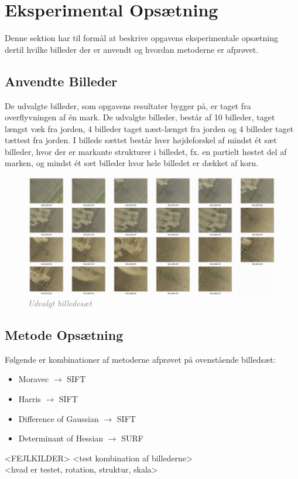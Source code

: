 \chapter{Eksperimental Opsætning}
Denne sektion har til formål at beskrive opgavens eksperimentale opsætning dertil hvilke billeder der er anvendt og hvordan metoderne er afprøvet.
\section{Anvendte Billeder}
De udvalgte billeder, som opgavens resultater bygger på, er taget fra overflyvningen af én mark. De udvalgte billeder, består af 10 billeder, taget længst væk fra jorden, 4 billeder taget næst-længst fra jorden og 4 billeder taget tættest fra jorden. I billede sættet består hver højdeforskel af mindst ét sæt billeder, hvor der er markante strukturer i billedet, fx. en partielt høstet del af marken, og mindst ét sæt billeder hvor hele billedet er dækket af korn.
\begin{figure}[H]
    \centering
    \includegraphics[width=1\textwidth]{fig/43a.png}
    \vspace{-0.5em}   
    \begin{center}
    \caption{\textcolor{gray}{\footnotesize \textit{Udvalgt billedesæt}}}
    \label{fig:lindblob}
     \end{center}
  \end{figure}
       \vspace{-2.7em}
\noindent
\section{Metode Opsætning}
Følgende er kombinationer af metoderne afprøvet på ovenstående billedsæt:
\begin{itemize}
\item{Moravec $\rightarrow$ SIFT}
\item{Harris $\rightarrow$ SIFT}
\item{Difference of Gaussian $\rightarrow$ SIFT}
\item{Determinant of Hessian $\rightarrow$ SURF}
\end{itemize}
<FEJLKILDER>
<test kombination af billederne> \\
<hvad er testet, rotation, struktur, skala>